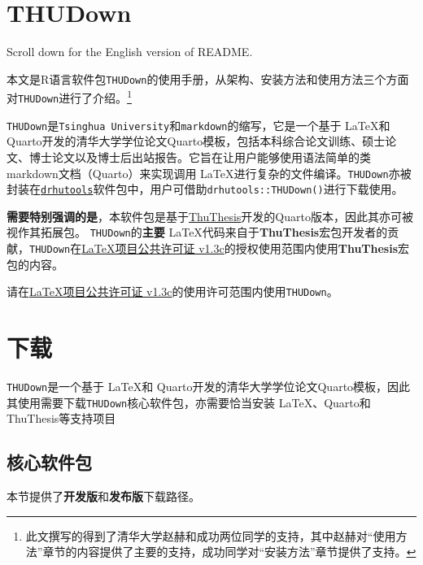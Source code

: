 
\hypertarget{thudown}{%
\chapter{THUDown}\label{thudown}}

Scroll down for the English version of README.

本文是R语言软件包\texttt{THUDown}的使用手册，从架构、安装方法和使用方法三个方面对\texttt{THUDown}进行了介绍。\footnote{此文撰写的得到了清华大学赵赫和成功两位同学的支持，其中赵赫对``使用方法''章节的内容提供了主要的支持，成功同学对``安装方法''章节提供了支持。}

\texttt{THUDown}是\texttt{Tsinghua\ University}和\texttt{markdown}的缩写，它是一个基于
\LaTeX 和
Quarto开发的清华大学学位论文Quarto模板，包括本科综合论文训练、硕士论文、博士论文以及博士后出站报告。它旨在让用户能够使用语法简单的类markdown文档（Quarto）来实现调用
\LaTeX 进行复杂的文件编译。\texttt{THUDown}亦被封装在\href{https://sammo3182.github.io/software/drhutools/}{\texttt{drhutools}}软件包中，用户可借助\texttt{drhutools::THUDown()}进行下载使用。

\textbf{需要特别强调的是}，本软件包是基于\href{https://github.com/tuna/thuthesis}{ThuThesis}开发的Quarto版本，因此其亦可被视作其拓展包。
\texttt{THUDown}的\textbf{主要}
\LaTeX 代码来自于\textbf{ThuThesis}宏包开发者的贡献，\texttt{THUDown}在\href{https://www.latex-project.org/lppl/lppl-1-3c/}{LaTeX项目公共许可证
v1.3c}的授权使用范围内使用\textbf{ThuThesis}宏包的内容。

请在\href{https://www.latex-project.org/lppl/lppl-1-3c/}{LaTeX项目公共许可证
v1.3c}的使用许可范围内使用\texttt{THUDown}。


\hypertarget{ux4e0bux8f7d}{%
\chapter{下载}\label{ux4e0bux8f7d}}

\texttt{THUDown}是一个基于 \LaTeX 和
Quarto开发的清华大学学位论文Quarto模板，因此其使用需要下载\texttt{THUDown}核心软件包，亦需要恰当安装
\LaTeX 、Quarto和ThuThesis等支持项目

\hypertarget{ux6838ux5fc3ux8f6fux4ef6ux5305}{%
\section{核心软件包}\label{ux6838ux5fc3ux8f6fux4ef6ux5305}}

本节提供了\textbf{开发版}和\textbf{发布版}下载路径。

